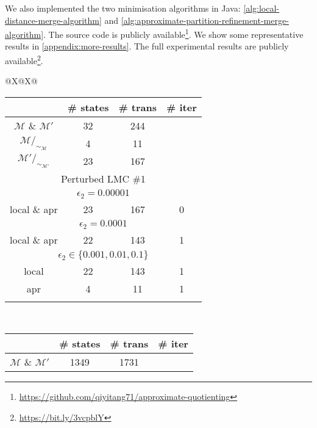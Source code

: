 \documentclass[a4paper,UKenglish,cleveref,autoref,thm-restate]{lipics-v2021}
\newcommand{\M}{\mathcal{M}}
\newcommand{\Hyp}{\mathcal{M}'}%
\begin{document}
We also implemented the two minimisation algorithms in Java: \cref{alg:local-distance-merge-algorithm} and \cref{alg:approximate-partition-refinement-merge-algorithm}. The source code is publicly available\footnote{\url{https://github.com/qiyitang71/approximate-quotienting}}. We show some representative results in \cref{appendix:more-results}. The full experimental results are publicly available\footnote{\url{https://bit.ly/3vcpblY}}.

\begin{table}[t]
\begin{tabularx}{\textwidth}{@{}X@{}X@{}}
	\noindent\begin{tabular}{|c|c|c|c|}
			\hline %
			\multirow{1}{*}{\shortstack[l]{Herman5}}&
			\# states&	\# trans&	\# iter\\
			\hline 						
			$\M$ \& $\Hyp$	&		 		32	  &			244				&\\
			$\M/_{\sim_{\M}}$	&		 		4	  &			11				&\\		
			$\Hyp/_{\sim_{\Hyp}}$      & 		23  &	       167             & \\
			\hline
			\multicolumn{4}{|c|}{Perturbed LMC \#1}\\
			\hline
			\multicolumn{4}{|c|}{$\epsilon_2 = 0.00001$}\\
			\hline
			local \& apr     & 23 & 167 & 0  \\
			\hline
			\multicolumn{4}{|c|}{$\epsilon_2 = 0.0001$}\\
			\hline
			local \& apr     & 22 & 143 & 1  \\
			\hline
			\multicolumn{4}{|c|}{$\epsilon_2 \in \{0.001, 0.01, 0.1\}$}\\
			\hline
			local    & 22 & 143 & 1    \\
			\rowcolor{yellow}
			apr		   & 4 & 11 & 1   \\
			\hline
			\rowcolor{white}
			\multicolumn{4}{c}{}\\			
		\end{tabular}
	~
		\noindent\begin{tabular}{|c|c|c|c|}
		\hline
		\multirow{1}{*}{\shortstack[l]{BRP32-2%
		}} &
		\# states&	\# trans&	\# iter\\
		\hline
		$\M$ \& $\Hyp$ &	1349	 &			1731    & \\

\end{tabular}
\end{tabularx}
\end{table}
\end{document}
